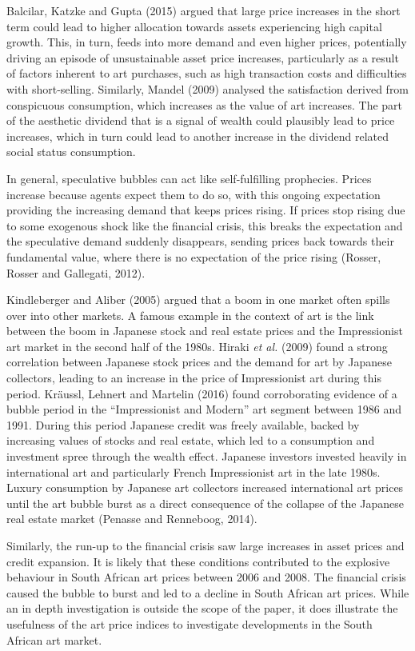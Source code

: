 \documentclass[12pt,]{article}
\begin{document}
Balcilar, Katzke and Gupta (2015) argued that large price increases in
the short term could lead to higher allocation towards assets
experiencing high capital growth. This, in turn, feeds into more demand
and even higher prices, potentially driving an episode of unsustainable
asset price increases, particularly as a result of factors inherent to
art purchases, such as high transaction costs and difficulties with
short-selling. Similarly, Mandel (2009) analysed the satisfaction
derived from conspicuous consumption, which increases as the value of
art increases. The part of the aesthetic dividend that is a signal of
wealth could plausibly lead to price increases, which in turn could lead
to another increase in the dividend related social status consumption.

In general, speculative bubbles can act like self-fulfilling prophecies.
Prices increase because agents expect them to do so, with this ongoing
expectation providing the increasing demand that keeps prices rising. If
prices stop rising due to some exogenous shock like the financial
crisis, this breaks the expectation and the speculative demand suddenly
disappears, sending prices back towards their fundamental value, where
there is no expectation of the price rising (Rosser, Rosser and
Gallegati, 2012).

Kindleberger and Aliber (2005) argued that a boom in one market often
spills over into other markets. A famous example in the context of art
is the link between the boom in Japanese stock and real estate prices
and the Impressionist art market in the second half of the 1980s. Hiraki
\emph{et al.} (2009) found a strong correlation between Japanese stock
prices and the demand for art by Japanese collectors, leading to an
increase in the price of Impressionist art during this period. Kräussl,
Lehnert and Martelin (2016) found corroborating evidence of a bubble
period in the ``Impressionist and Modern'' art segment between 1986 and
1991. During this period Japanese credit was freely available, backed by
increasing values of stocks and real estate, which led to a consumption
and investment spree through the wealth effect. Japanese investors
invested heavily in international art and particularly French
Impressionist art in the late 1980s. Luxury consumption by Japanese art
collectors increased international art prices until the art bubble burst
as a direct consequence of the collapse of the Japanese real estate
market (Penasse and Renneboog, 2014).

Similarly, the run-up to the financial crisis saw large increases in
asset prices and credit expansion. It is likely that these conditions
contributed to the explosive behaviour in South African art prices
between 2006 and 2008. The financial crisis caused the bubble to burst
and led to a decline in South African art prices. While an in depth
investigation is outside the scope of the paper, it does illustrate the
usefulness of the art price indices to investigate developments in the
South African art market.
\end{document}
